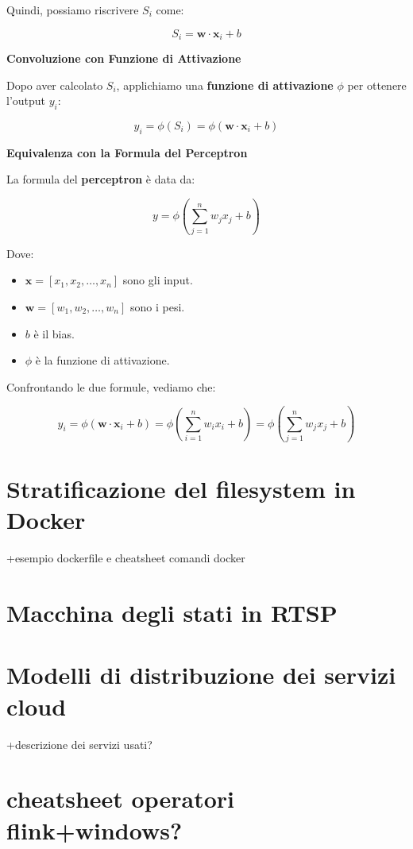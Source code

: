 Quindi, possiamo riscrivere \( S_i \) come:

\[
S_i = \mathbf{w} \cdot \mathbf{x}_i + b
\]

\noindent\textbf{Convoluzione con Funzione di Attivazione}

\vspace{0.5em} %

\noindent Dopo aver calcolato \( S_i \), applichiamo una \textbf{funzione di attivazione} \( \phi \) per ottenere l'output \( y_i \):

\[
y_i = \phi(S_i) = \phi\left(\mathbf{w} \cdot \mathbf{x}_i + b\right)
\]

\noindent\textbf{Equivalenza con la Formula del Perceptron}

\vspace{0.5em} %

\noindent La formula del \textbf{perceptron} è data da:

\[
y = \phi\left(\sum_{j=1}^{n} w_j x_j + b\right)
\]

Dove:
\begin{itemize}
    \item \( \mathbf{x} = [x_1, x_2, \dots, x_n] \) sono gli input.
    \item \( \mathbf{w} = [w_1, w_2, \dots, w_n] \) sono i pesi.
    \item \( b \) è il bias.
    \item \( \phi \) è la funzione di attivazione.
\end{itemize}

\noindent Confrontando le due formule, vediamo che:

\[
y_i = \phi\left(\mathbf{w} \cdot \mathbf{x}_i + b\right) = \phi\left(\sum_{i=1}^{n} w_i x_i + b\right) = \phi\left(\sum_{j=1}^{n} w_j x_j + b\right)
\]

\section*{Stratificazione del filesystem in Docker}+esempio dockerfile e cheatsheet comandi docker
\section*{Macchina degli stati in RTSP}
\section*{Modelli di distribuzione dei servizi cloud}+descrizione dei servizi usati?
\section*{cheatsheet operatori flink+windows?}

